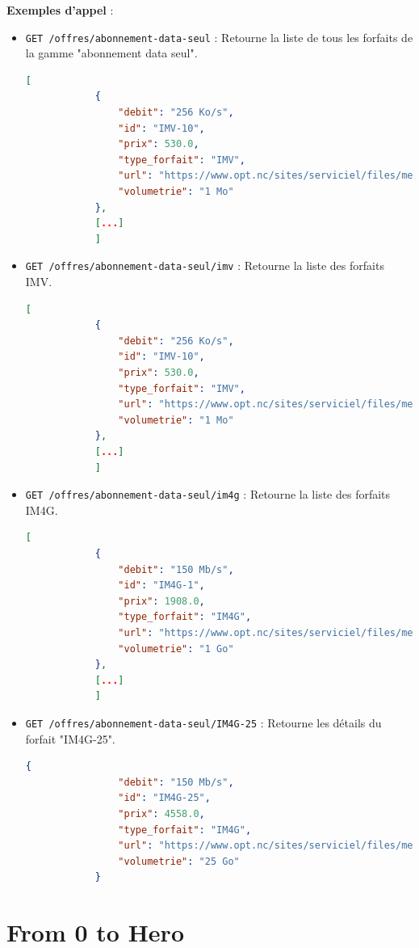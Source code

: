 \documentclass{article}
\begin{document}
	\textbf{Exemples d'appel} :
	\begin{itemize}
		\item \texttt{GET /offres/abonnement-data-seul} : Retourne la liste de tous les forfaits de la gamme "abonnement data seul".
		\begin{lstlisting}[language=JSON]
			[
			{
				"debit": "256 Ko/s",
				"id": "IMV-10",
				"prix": 530.0,
				"type_forfait": "IMV",
				"url": "https://www.opt.nc/sites/serviciel/files/media/file/FI_Internet%20Mobile%20au%20Volume.pdf",
				"volumetrie": "1 Mo"
			},
			[...]
			]
		\end{lstlisting}
		
		\item \texttt{GET /offres/abonnement-data-seul/imv} : Retourne la liste des forfaits IMV.
		\begin{lstlisting}[language=JSON]
			[
			{
				"debit": "256 Ko/s",
				"id": "IMV-10",
				"prix": 530.0,
				"type_forfait": "IMV",
				"url": "https://www.opt.nc/sites/serviciel/files/media/file/FI_Internet%20Mobile%20au%20Volume.pdf",
				"volumetrie": "1 Mo"
			},
			[...]
			]
		\end{lstlisting}
		
		\item \texttt{GET /offres/abonnement-data-seul/im4g} : Retourne la liste des forfaits IM4G.
		\begin{lstlisting}[language=JSON]
			[
			{
				"debit": "150 Mb/s",
				"id": "IM4G-1",
				"prix": 1908.0,
				"type_forfait": "IM4G",
				"url": "https://www.opt.nc/sites/serviciel/files/media/file/FI_ForfaitInternetMobile4G%202022_1.pdf",
				"volumetrie": "1 Go"
			},
			[...]
			]
		\end{lstlisting}
		
		\item \texttt{GET /offres/abonnement-data-seul/IM4G-25} : Retourne les détails du forfait "IM4G-25".
		\begin{lstlisting}[language=JSON]
			{
				"debit": "150 Mb/s",
				"id": "IM4G-25",
				"prix": 4558.0,
				"type_forfait": "IM4G",
				"url": "https://www.opt.nc/sites/serviciel/files/media/file/FI_ForfaitInternetMobile4G%202022_1.pdf",
				"volumetrie": "25 Go"
			}
		\end{lstlisting}
	\end{itemize}
	
	\newpage
	
	\section{From 0 to Hero}
	
\end{document}
